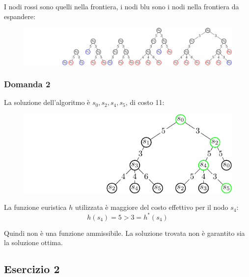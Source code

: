 \documentclass{article}
\numberwithin{equation}{section}
\begin{document}
I nodi rossi sono quelli nella frontiera, i nodi blu sono i nodi nella frontiera da espandere:

\begin{figure}[H]%
    \centering%
    \includegraphics[trim={3.9cm 0 0 0}, scale=0.95]{albero_esercitazione_1.pdf}%
\end{figure}

\subsubsection*{Domanda 2}

La soluzione dell'algoritmo è $s_0,s_2,s_4,s_5$, di costo 11:
\begin{figure}[H]%
    \centering%
    \includegraphics[trim={4cm 0 0 0}]{soluzione_esercitazione_1.pdf}%
\end{figure}

La funzione euristica $h$ utilizzata è maggiore del costo effettivo per il nodo $s_4$: 
\begin{equation}
    h(s_4)=5>3=h^*(s_4)
\end{equation}

Quindi non è una funzione ammissibile. La soluzione trovata 
non è garantito sia la soluzione ottima. 

\subsection{Esercizio 2}
\end{document}
